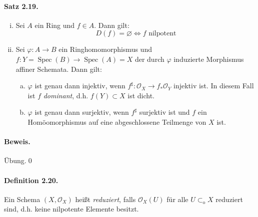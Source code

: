 \paragraph{Satz 2.19.}\label{2.19} \begin{enumerate}[(i)]
\item Sei $A$ ein Ring und $f\in A$. Dann gilt:
\[D(f)=\varnothing\iff f\text{ nilpotent} \]
\item Sei $\varphi:A\to B$ ein Ringhomomorphismus und $f: Y=\operatorname{Spec}(B)\to\operatorname{Spec}(A)=X$ der durch $\varphi$ induzierte Morphismus affiner Schemata. Dann gilt:
\begin{enumerate}[(a)]
\item $\varphi$ ist genau dann injektiv, wenn $f^\sharp:\mathcal{O}_X\to f_\ast\mathcal{O}_Y$ injektiv ist. In diesem Fall ist $f$ \textit{dominant}, d.h. $f(Y)\subset X$ ist dicht.
\item $\varphi$ ist genau dann surjektiv, wenn $f^\sharp$ surjektiv ist und $f$ ein Homöomorphismus auf eine abgeschlossene Teilmenge von $X$ ist.
\end{enumerate}
\end{enumerate}

\paragraph{Beweis.} Übung.\qed


\paragraph{Definition 2.20.}\label{2.20} Ein Schema $(X,\mathcal{O}_X)$ heißt \textit{reduziert}, falls $\mathcal{O}_X(U)$ für alle $U\subset_\text{o}X$ reduziert sind, d.h. keine nilpotente Elemente besitzt.

